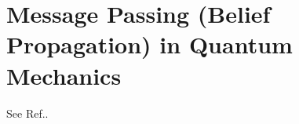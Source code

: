 \chapter{Message Passing
(Belief Propagation) in Quantum Mechanics}
\label{ch-mpass-qm}

See Ref.\cite{tucci-dsep-qm}.
